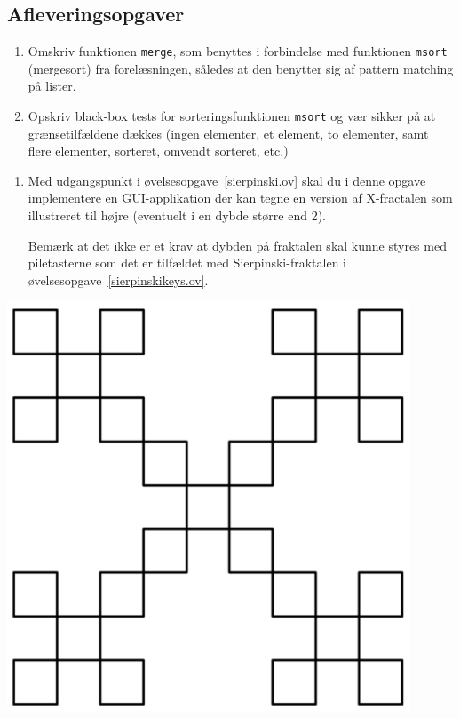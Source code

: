 \documentclass[a4paper,12pt]{article}
\begin{document}
\begin{enumerate}[label=8ø.\arabic*,start=0]
\section*{Afleveringsopgaver}
\begin{enumerate}[label=8i.\arabic*,start=0]
\item Omskriv funktionen \lstinline{merge}, som benyttes i forbindelse
  med funktionen \lstinline{msort} (mergesort) fra forelæsningen,
  således at den benytter sig af pattern matching på lister.
\item Opskriv black-box tests for sorteringsfunktionen \lstinline{msort} og vær
  sikker på at grænsetilfældene dækkes (ingen elementer, et element,
  to elementer, samt flere elementer, sorteret, omvendt sorteret, etc.)
\end{enumerate}

\begin{minipage}{0.7\textwidth}
\begin{enumerate}[label=8i.\arabic*,start=2]
\item Med udgangspunkt i øvelsesopgave~\ref{sierpinski.ov} skal du i
  denne opgave implementere en GUI-applikation der kan tegne en
  version af X-fractalen som illustreret til højre (eventuelt i en
  dybde større end 2).

  Bemærk at det ikke er et krav at dybden på fraktalen skal kunne
  styres med piletasterne som det er tilfældet med
  Sierpinski-fraktalen i øvelsesopgave~\ref{sierpinskikeys.ov}.
\end{enumerate}
\end{minipage}\hspace{8mm} \begin{minipage}{0.25\textwidth}
  \includegraphics[width=0.9\textwidth]{xfractal.png}
\end{minipage}


\end{enumerate}
\end{document}
